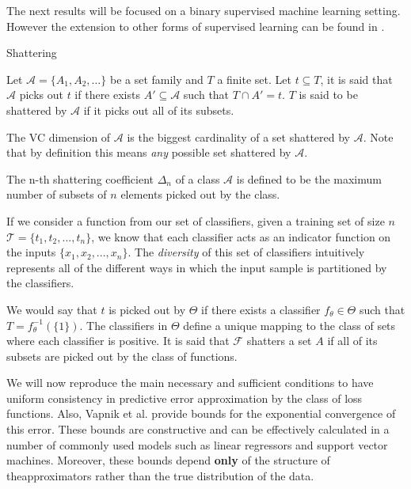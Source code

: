 	The next results will be focused on a binary supervised machine learning setting. However the extension to other forms of supervised learning can be found in \cite{cherkassky-learning2007}. 

\begin{definition}{Shattering}
	
	Let $\mathcal {A}= \{A_1,A_{2},\dots \}$ be a set family and $T$ a finite set. Let $t \subseteq T$, it is said that $\mathcal {A}$ picks out $t$ if there exists $A' \subseteq \mathcal {A} $ such that $ T \cap A' = t$. $T$ is said to be shattered by $\mathcal {A}$ if it picks out all of its subsets.
	
	The VC dimension of $\mathcal {A}$ is the biggest cardinality of a set shattered by $\mathcal {A}$. Note that by definition this means \textit{any} possible set shattered by $\mathcal {A}$.

\end{definition}

The n-th shattering coefficient $\Delta_n$ of a class $\mathcal {A}$ is defined to be the maximum number of subsets of $n$ elements picked out by the class. 

If we consider a function from our set of classifiers, given a training set of size $n$
$\mathcal {T} = \{ t_1,t_2,...,t_n  \}$, we know that each classifier acts as an indicator function on the inputs $\{ x_1,x_2,...,x_n  \}$. The \textit{diversity} of this set of classifiers intuitively represents all of the different ways in which the input sample is partitioned by the classifiers. 

We would say that $t$ is picked out by $\Theta$ if there exists a classifier $f_{\theta} \in \Theta$ such that $T = f_{\theta}^{-1}(\{1\})$. The classifiers in $\Theta$ define a unique mapping to the class of sets where each classifier is positive. It is said that $\mathcal {F}$ shatters a set $A$ if all of its subsets are picked out by the class of functions.

We will now reproduce the main necessary and sufficient conditions to have uniform consistency in predictive error approximation by the class of loss functions. Also,
Vapnik et al. provide bounds for the exponential convergence of this error. These bounds are constructive and can be effectively calculated in a number of commonly used models such as linear regressors and support vector machines. Moreover, these bounds depend \textbf{only} of the structure of theapproximators rather than the true distribution of the data. 


